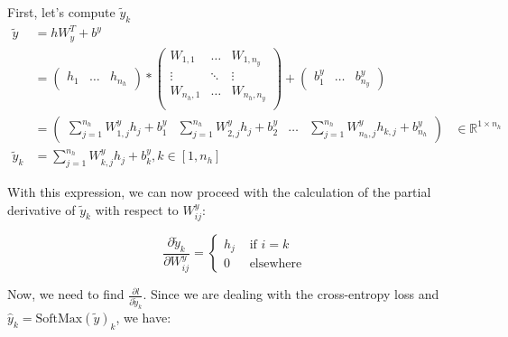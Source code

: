\documentclass{article}
\theoremstyle{plain}%
\theoremstyle{definition}
\theoremstyle{remark}
\begin{document}
First, let's compute $ \tilde{y}_k $
\begin{align*}
    \tilde{y}   & = h W_y^T + b^y                                                                                                                                  \\
                & = \begin{pmatrix}
                        h_{1} & \dots & h_{n_h}
                    \end{pmatrix} * \begin{pmatrix}
                                        W_{1, 1}   & \dots  & W_{1, n_y}   \\
                                        \vdots     & \ddots & \vdots       \\
                                        W_{n_h, 1} & \dots  & W_{n_h, n_y} \\
                                    \end{pmatrix} + \begin{pmatrix}
                                                        b^y_1 & \dots & b^y_{n_y}
                                                    \end{pmatrix}                                                                                      \\
                & = \begin{pmatrix}
                        \sum_{j=1}^{n_h} W^y_{1,j} h_{j} + b^y_1 & \sum_{j=1}^{n_h} W^y_{2,j} h_{j} + b^y_2 & \dots & \sum_{j=1}^{n_h} W^y_{n_h,j} h_{k,j} + b^y_{n_h}
                    \end{pmatrix} & \in \mathbb{R}^{1 \times n_h} \\
    \tilde{y}_k & = \sum_{j=1}^{n_h} W^y_{k,j} h_{j} + b_k^y, k \in [1, n_h]
\end{align*}

With this expression, we can now proceed with the calculation of the partial derivative of \( \tilde{y}_k \) with respect to \( W^y_{ij} \):

\[
    \frac{\partial \tilde{y}_k }{\partial W^y_{ij}} = \begin{cases}
        h_j & \text{ if } i=k   \\
        0   & \text{ elsewhere}
    \end{cases}
\]

Now, we need to find \( \frac{\partial l}{\partial \tilde{y}_k} \). Since we are dealing with the cross-entropy loss and \( \hat{y}_k = \text{SoftMax}(\tilde{y})_k \), we have:
\end{document}
